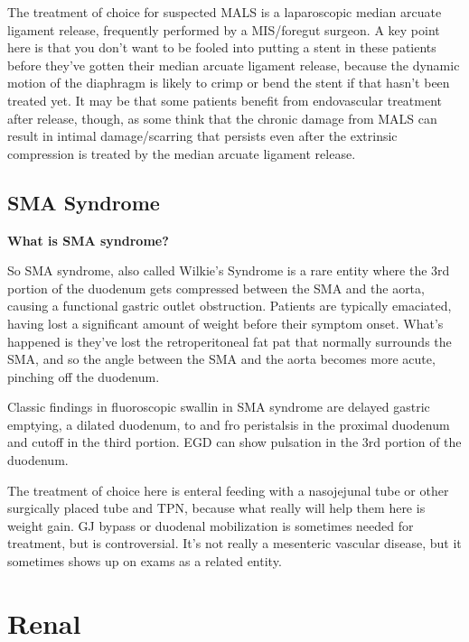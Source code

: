 \documentclass[
]{book}
\begin{document}
The treatment of choice for suspected MALS is a laparoscopic median
arcuate ligament release, frequently performed by a MIS/foregut surgeon.
A key point here is that you don't want to be fooled into putting a
stent in these patients before they've gotten their median arcuate
ligament release, because the dynamic motion of the diaphragm is likely
to crimp or bend the stent if that hasn't been treated yet. It may be
that some patients benefit from endovascular treatment after release,
though, as some think that the chronic damage from MALS can result in
intimal damage/scarring that persists even after the extrinsic
compression is treated by the median arcuate ligament release.

\hypertarget{sma-syndrome}{%
\section{SMA Syndrome}\label{sma-syndrome}}

\textbf{What is SMA syndrome?}

So SMA syndrome, also called Wilkie's Syndrome is a rare entity where
the 3rd portion of the duodenum gets compressed between the SMA and the
aorta, causing a functional gastric outlet obstruction. Patients are
typically emaciated, having lost a significant amount of weight before
their symptom onset. What's happened is they've lost the retroperitoneal
fat pat that normally surrounds the SMA, and so the angle between the
SMA and the aorta becomes more acute, pinching off the duodenum.

Classic findings in fluoroscopic swallin in SMA syndrome are delayed
gastric emptying, a dilated duodenum, to and fro peristalsis in the
proximal duodenum and cutoff in the third portion. EGD can show
pulsation in the 3rd portion of the
duodenum.\citep{warnckeSuperiorMesentericArtery2019}

The treatment of choice here is enteral feeding with a nasojejunal tube
or other surgically placed tube and TPN, because what really will help
them here is weight gain. GJ bypass or duodenal mobilization is
sometimes needed for treatment, but is controversial. It's not really a
mesenteric vascular disease, but it sometimes shows up on exams as a
related entity.\citep{welschRecallingSuperiorMesenteric2007, merrettSuperiorMesentericArtery2009}

\hypertarget{renal}{%
\chapter{Renal}\label{renal}}
\end{document}
